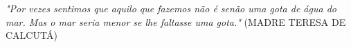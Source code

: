\pretextualchapter{}

\vspace*{15cm}
\hspace{.4\textwidth}
\begin{minipage}{.5\textwidth}
	\textit{"Por vezes sentimos que aquilo que fazemos não é senão uma gota de água do mar. Mas o mar seria menor se lhe faltasse uma gota."}
	\flushright
	(MADRE TERESA DE CALCUTÁ)
\end{minipage}